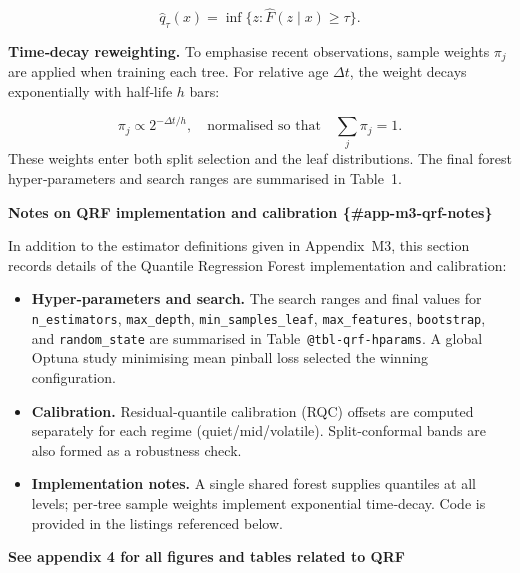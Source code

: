 \documentclass[
  a4paper,
  DIV=11,
  numbers=noendperiod]{scrreprt}
\providecommand{\tightlist}{%
  \setlength{\itemsep}{0pt}\setlength{\parskip}{0pt}}
\begin{document}
\[
\widehat q_{\tau}(x) = \inf\big\{ z : \widehat F(z\mid x) \ge \tau \big\}.
\]

\textbf{Time‑decay reweighting.} To emphasise recent observations,
sample weights \(\pi_j\) are applied when training each tree. For
relative age \(\Delta t\), the weight decays exponentially with
half‑life \(h\) bars:

\[
\pi_j \propto 2^{-\Delta t/h},
\quad\text{normalised so that}\quad \sum_j \pi_j = 1.
\] These weights enter both split selection and the leaf distributions.
The final forest hyper‑parameters and search ranges are summarised in
Table~1.

\textbf{Notes on QRF implementation and calibration
\{\#app-m3-qrf-notes\}}

In addition to the estimator definitions given in Appendix~M3, this
section records details of the Quantile Regression Forest implementation
and calibration:

\begin{itemize}
\tightlist
\item
  \textbf{Hyper‑parameters and search.} The search ranges and final
  values for \texttt{n\_estimators}, \texttt{max\_depth},
  \texttt{min\_samples\_leaf}, \texttt{max\_features},
  \texttt{bootstrap}, and \texttt{random\_state} are summarised in
  Table~\texttt{@tbl-qrf-hparams}. A global Optuna study minimising mean
  pinball loss selected the winning configuration.
\item
  \textbf{Calibration.} Residual‑quantile calibration (RQC) offsets are
  computed separately for each regime (quiet/mid/volatile).
  Split‑conformal bands are also formed as a robustness check.\\
\item
  \textbf{Implementation notes.} A single shared forest supplies
  quantiles at all levels; per‑tree sample weights implement exponential
  time‑decay. Code is provided in the listings referenced below.
\end{itemize}

\textbf{See appendix 4 for all figures and tables related to QRF}
\end{document}
